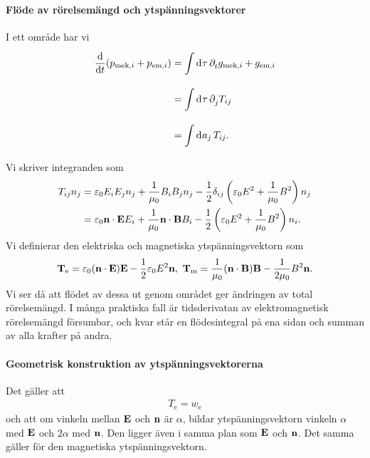 \paragraph{Flöde av rörelsemängd och ytspänningsvektorer}
I ett område har vi
\begin{align*}
	\dv{t}(p_{\text{mek}, i} + p_{\text{em}, i}) &= \int\limits_{}^{}\dd[]{\tau}\partial_{t}^{}g_{\text{mek}, i} + g_{\text{em}, i} \\
	                                             &= \int\limits_{}^{}\dd[]{\tau}\partial_{j}^{}T_{ij} \\
	                                             &= \int\limits_{}^{}\dd[]{a_{j}}T_{ij}.
\end{align*}
Vi skriver integranden som
\begin{align*}
	T_{ij}n_{j} &= \varepsilon_{0}E_{i}E_{j}n_{j} + \frac{1}{\mu_{0}}B_{i}B_{j}n_{j} - \frac{1}{2}\delta_{ij}\left(\varepsilon_{0}E^{2} + \frac{1}{\mu_{0}}B^{2}\right)n_{j} \\
	            &= \varepsilon_{0}\vb{n}\cdot\vb{E}E_{i} + \frac{1}{\mu_{0}}\vb{n}\cdot\vb{B}B_{i} - \frac{1}{2}\left(\varepsilon_{0}E^{2} + \frac{1}{\mu_{0}}B^{2}\right)n_{i}.
\end{align*}
Vi definierar den elektriska och magnetiska ytspänningsvektorn som
\begin{align*}
	\vb{T}_{\text{e}} = \varepsilon_{0}(\vb{n}\cdot\vb{E})\vb{E} - \frac{1}{2}\varepsilon_{0}E^{2}\vb{n},\ \vb{T}_{\text{m}} = \frac{1}{\mu_{0}}(\vb{n}\cdot\vb{B})\vb{B} - \frac{1}{2\mu_{0}}B^{2}\vb{n}.
\end{align*}
Vi ser då att flödet av dessa ut genom området ger ändringen av total rörelsemängd. I många praktiska fall är tidsderivatan av elektromagnetisk rörelsemängd försumbar, och kvar står en flödesintegral på ena sidan och summan av alla krafter på andra.

\paragraph{Geometrisk konstruktion av ytspänningsvektorerna}
Det gäller att
\begin{align*}
	T_{\text{e}} = w_{\text{e}}
\end{align*}
och att om vinkeln mellan $\vb{E}$ och $\vb{n}$ är $\alpha$, bildar ytspänningsvektorn vinkeln $\alpha$ med $\vb{E}$ och $2\alpha$ med $\vb{n}$. Den ligger även i samma plan som $\vb{E}$ och $\vb{n}$. Det samma gäller för den magnetiska ytspänningsvektorn.

